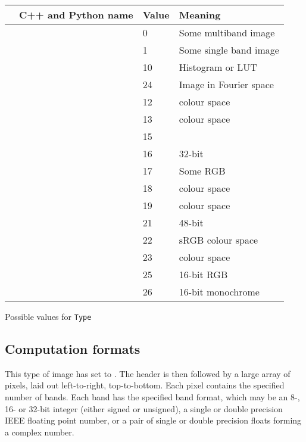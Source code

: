 \begin{tab2}
\begin{center}
\begin{tabular}{|l|l|l|l|}
\hline
\ct{Type} & C++ and Python name & Value & Meaning \\
\hline
\ct{IM\_TYPE\_MULTIBAND} & \ct{MULTIBAND} & 0  & Some multiband image \\
\ct{IM\_TYPE\_B\_W} 	 & \ct{B\_W}      & 1  & Some single band image \\
\ct{IM\_TYPE\_HISTOGRAM} & \ct{HISTOGRAM} & 10 & Histogram or LUT \\
\ct{IM\_TYPE\_FOURIER} 	 & \ct{FOURIER}   & 24 & Image in Fourier space \\
\ct{IM\_TYPE\_XYZ} 	 & \ct{XYZ}       & 12 & \ciexyz{} colour space \\
\ct{IM\_TYPE\_LAB} 	 & \ct{LAB}       & 13 & \cielab{} colour space \\ 
\ct{IM\_TYPE\_CMYK} 	 & \ct{CMYK}      & 15 & \ct{im\_icc\_export()} \\
\ct{IM\_TYPE\_LABQ} 	 & \ct{LABQ}      & 16 & 32-bit \cielab{} \\
\ct{IM\_TYPE\_RGB} 	 & \ct{RGB}       & 17 & Some RGB \\
\ct{IM\_TYPE\_UCS} 	 & \ct{UCS}       & 18 & \cieucs{} colour space \\
\ct{IM\_TYPE\_LCH} 	 & \ct{LCH}       & 19 & \cielch{} colour space \\
\ct{IM\_TYPE\_LABS} 	 & \ct{LABS}      & 21 & 48-bit \cielab{} \\
\ct{IM\_TYPE\_sRGB} 	 & \ct{sRGB}      & 22 & sRGB colour space \\
\ct{IM\_TYPE\_YXY} 	 & \ct{YXY}       & 23 & \cieyxy{} colour space \\
\ct{IM\_TYPE\_RGB16} 	 & \ct{RGB16}     & 25 & 16-bit RGB \\
\ct{IM\_TYPE\_GREY16} 	 & \ct{GREY16}    & 26 & 16-bit monochrome \\
\hline
\end{tabular}
\end{center}
\caption{Possible values for \texttt{Type}\label{fg:type}}
\end{tab2}

\subsection{Computation formats}

This type of image has  set to . The
header is then followed by a large array of pixels, laid out left-to-right,
top-to-bottom.  Each pixel contains the specified number of bands. Each band
has the specified band format, which may be an 8-, 16- or 32-bit integer
(either signed or unsigned), a single or double precision IEEE floating
point number, or a pair of single or double precision floats forming a
complex number.

